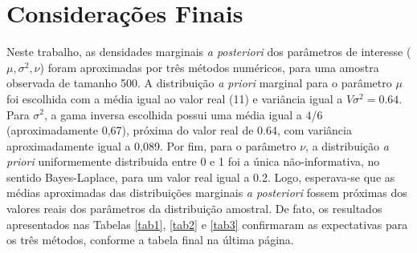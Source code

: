 \section{Considerações Finais}\label{consfin}


Neste trabalho, as densidades marginais \textit{a posteriori} dos parâmetros de interesse ($\mu, \sigma^2, \nu$) foram aproximadas por três métodos numéricos, para uma amostra observada de tamanho 500. A distribuição \textit{a priori} marginal para o parâmetro $\mu$ foi escolhida com a média igual ao valor real (11) e variância igual a $V\sigma^2 = 0.64$. Para $\sigma^2$, a gama inversa escolhida possui uma média igual a $4$/$6$ (aproximadamente 0,67), próxima do valor real de 0.64, com variância aproximadamente igual a 0,089. Por fim, para o parâmetro $\nu$, a distribuição \textit{a priori} uniformemente distribuida entre 0 e 1 foi a única não-informativa, no sentido Bayes-Laplace, para um valor real igual a 0.2. Logo, esperava-se que as médias aproximadas das distribuições marginais \textit{a posteriori} fossem próximas dos valores reais dos parâmetros da distribuição amostral. De fato, os resultados apresentados nas Tabelas \ref{tab1}, \ref{tab2} e \ref{tab3} confirmaram as expectativas para os três métodos, conforme a tabela final na última página.

